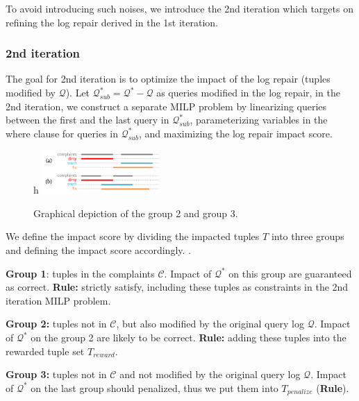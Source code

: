 To avoid introducing such noises, we introduce the 
2nd iteration which targets on refining the log repair derived in 
the 1st iteration. 
\subsubsection{2nd iteration}
The goal for 2nd iteration is to optimize the impact of the log repair (tuples
modified by $\mathcal{Q}$). 
Let $\mathcal{Q}^*_{sub} = \mathcal{Q}^*-\mathcal{Q}$ as 
queries modified in the log repair, in the 2nd iteration, we 
construct a separate MILP problem by linearizing 
 queries between the first and the last query in
$\mathcal{Q}^*_{sub}$, parameterizing variables in 
the where clause for queries in $\mathcal{Q}^*_{sub}$,
and maximizing the log repair impact score. 

\begin{figure}{h}
    \centering
    \includegraphics[width=0.4\textwidth]{figures/2nditerationgroups}
    \caption{Graphical depiction of the group 2 and group 3. }
    \label{fig:groups}
\end{figure}

We define the impact score by dividing the 
impacted tuples $T$ into three groups and defining the 
impact score accordingly. . 

\smallskip

\noindent\textbf{Group 1}: tuples in the complaints $\mathcal{C}$. Impact of 
$\mathcal{Q}^*$ on this group
are guaranteed as correct. \textbf{Rule:} 
strictly satisfy, including these tuples as 
constraints in the 2nd iteration MILP problem. 

\smallskip

\noindent\textbf{Group 2:} tuples not in $\mathcal{C}$, but also modified 
by the original query log $\mathcal{Q}$. Impact of $\mathcal{Q}^*$ 
on the group 2 are likely to
be correct. \textbf{Rule:} adding these tuples into the 
rewarded tuple set $T_{reward}$. 

\smallskip

\noindent\textbf{Group 3:} tuples not in $\mathcal{C}$ and not modified 
by the original query log $\mathcal{Q}$. Impact of 
$\mathcal{Q}^*$ on the last group should penalized, thus 
we put them into $T_{penalize}$ (\textbf{Rule}).

